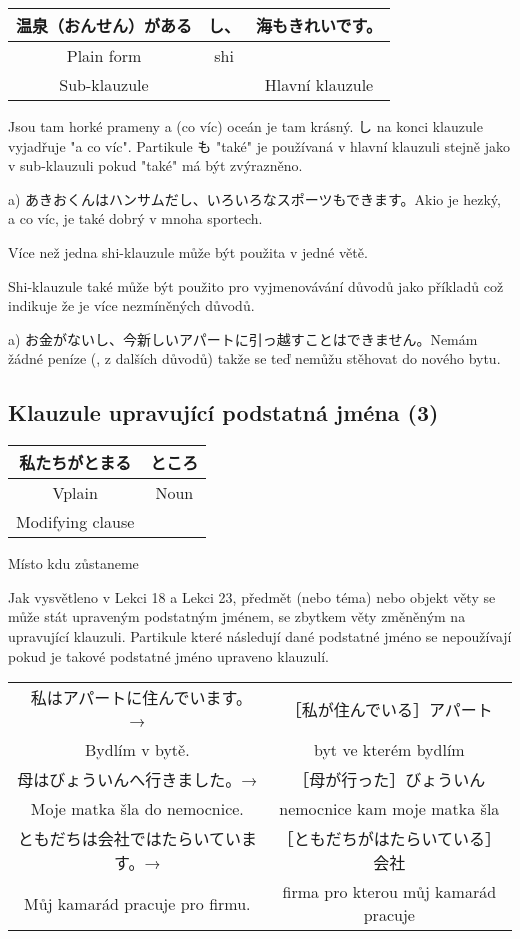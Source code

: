 \begin{center}
\begin{tabular}{|| c | c || c ||}
\hline
温泉（おんせん）がある&し、&海もきれいです。\\
\hline
Plain form&shi&\\
Sub-klauzule&&Hlavní klauzule\\
\hline
\end{tabular}
\end{center}
Jsou tam horké prameny a (co víc) oceán je tam krásný.
し na konci klauzule vyjadřuje "a co víc". Partikule も "také"  je používaná v hlavní klauzuli stejně jako v sub-klauzuli pokud "také" má být zvýrazněno.

a) あきおくんはハンサムだし、いろいろなスポーツもできます。Akio je hezký, a co víc, je také dobrý v mnoha sportech.

Více než jedna shi-klauzule může být použita v jedné větě.


Shi-klauzule také může být použito pro vyjmenovávání důvodů jako příkladů což indikuje že je více nezmíněných důvodů. 

a) お金がないし、今新しいアパートに引っ越すことはできません。Nemám žádné peníze (, z dalších důvodů) takže se teď nemůžu stěhovat do nového bytu. 


\subsection{Klauzule upravující podstatná jména (3)}

\begin{center}
\begin{tabular}{|| c || c ||}
\hline
私たちがとまる&ところ\\
\hline
Vplain&Noun\\
Modifying clause&\\
\hline
\end{tabular}
\end{center} 
Místo kdu zůstaneme


Jak vysvětleno v Lekci 18 a Lekci 23, předmět (nebo téma) nebo objekt věty se může stát upraveným podstatným jménem, se zbytkem věty změněným na upravující klauzuli. Partikule které následují dané podstatné jméno se nepoužívají pokud je takové podstatné jméno upraveno klauzulí.


\begin{center}
\begin{tabular}{c c}
私はアパートに住んでいます。　　　→ &［私が住んでいる］アパート\\
Bydlím v bytě.&byt ve kterém bydlím\\
母はびょういんへ行きました。→ &［母が行った］びょういん\\
Moje matka šla do nemocnice.&nemocnice kam moje matka šla\\
ともだちは会社ではたらいています。→ &［ともだちがはたらいている］会社\\
Můj kamarád pracuje pro firmu. & firma pro kterou můj kamarád pracuje\\
\end{tabular}
\end{center}


